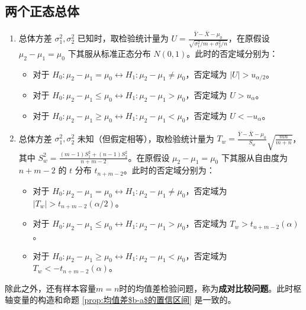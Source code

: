 \subsection{两个正态总体}\label{subsec:两个正态总体}
\begin{proposition}[两个正态总体均值差的假设检验]\label{prop:two_normal_mean_difference_hypothesis_test}
    \begin{enumerate}
        \item 总体方差 $\sigma_1^2, \sigma_2^2$ 已知时，取检验统计量为 $U = \frac{\bar{Y} - \bar{X} - \mu_0}{\sqrt{\sigma_1^2/m + \sigma_2^2/n}}$，在原假设 $\mu_2 - \mu_1 = \mu_0$ 下其服从标准正态分布 $N(0,1)$。此时的否定域分别为：
        \begin{itemize}
            \item 对于 $H_0: \mu_2 - \mu_1 = \mu_0 \leftrightarrow H_1: \mu_2 - \mu_1 \ne \mu_0$，否定域为 $|U| > u_{\alpha/2}$。
            \item 对于 $H_0: \mu_2 - \mu_1 \le \mu_0 \leftrightarrow H_1: \mu_2 - \mu_1 > \mu_0$，否定域为 $U > u_\alpha$。
            \item 对于 $H_0: \mu_2 - \mu_1 \ge \mu_0 \leftrightarrow H_1: \mu_2 - \mu_1 < \mu_0$，否定域为 $U < -u_\alpha$。
        \end{itemize}
        \item 总体方差 $\sigma_1^2, \sigma_2^2$ 未知（但假定相等），取检验统计量为 $T_w = \frac{\bar{Y} - \bar{X} - \mu_0}{S_w} \sqrt{\frac{mn}{m+n}}$，其中 $S_w^2 = \frac{(m-1)S_1^2 + (n-1)S_2^2}{n+m-2}$。在原假设 $\mu_2 - \mu_1 = \mu_0$ 下其服从自由度为 $n+m-2$ 的 $t$ 分布 $t_{n+m-2}$。此时的否定域分别为：
        \begin{itemize}
            \item 对于 $H_0: \mu_2 - \mu_1 = \mu_0 \leftrightarrow H_1: \mu_2 - \mu_1 \ne \mu_0$，否定域为 $|T_w| > t_{n+m-2}(\alpha/2)$。
            \item 对于 $H_0: \mu_2 - \mu_1 \le \mu_0 \leftrightarrow H_1: \mu_2 - \mu_1 > \mu_0$，否定域为 $T_w > t_{n+m-2}(\alpha)$。
            \item 对于 $H_0: \mu_2 - \mu_1 \ge \mu_0 \leftrightarrow H_1: \mu_2 - \mu_1 < \mu_0$，否定域为 $T_w < -t_{n+m-2}(\alpha)$。
        \end{itemize}
    \end{enumerate}
\end{proposition}

\begin{remark}
    除此之外，还有样本容量$m=n$时的均值差检验问题，称为\textbf{成对比较问题}。此时枢轴变量的构造和命题 \ref{prop:均值差$b-a$的置信区间} 是一致的。
\end{remark}


